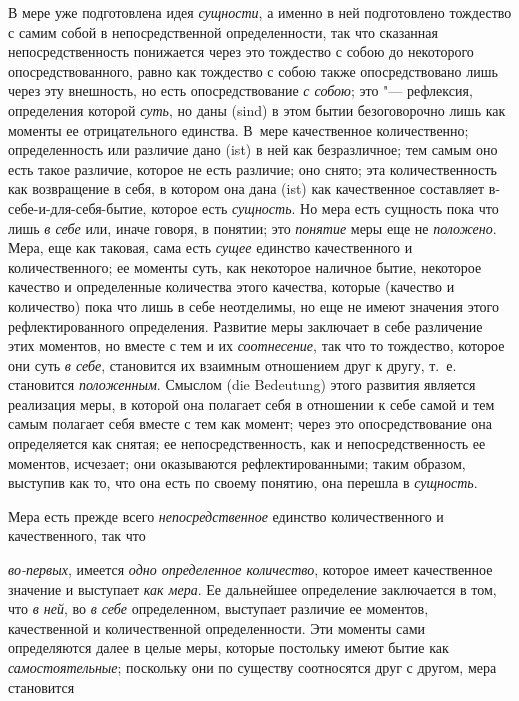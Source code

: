 В мере уже подготовлена идея {\em сущности}, а именно в
ней подготовлено тождество с самим собой в непосредственной определенности,
так что сказанная непосредственность понижается через это тождество с собою
до некоторого опосредствованного, равно как тождество с собою также
опосредствовано лишь через эту внешность, но есть опосредствование
{\em с собою}; это "--- рефлексия, определения которой
{\em суть}, но даны (sind) в этом бытии безоговорочно
лишь как моменты ее отрицательного единства. В~мере качественное
количественно; определенность или различие дано (ist) в ней как
безразличное; тем самым оно есть такое различие, которое не есть различие;
оно снято; эта количественность как возвращение в себя, в котором она дана
(ist) как качественное составляет в-себе-и-для-себя-бытие, которое есть
{\em сущность}. Но мера есть сущность пока что лишь
{\em в себе} или, иначе говоря, в понятии; это
{\em понятие} меры еще не
{\em положено}. Мера, еще как таковая, сама есть
{\em сущее} единство качественного и количественного;
ее моменты суть, как некоторое наличное бытие, некоторое качество и
определенные количества этого качества, которые (качество и количество)
пока что лишь в себе неотделимы, но еще не имеют значения этого
рефлектированного определения. Развитие меры заключает в себе различение
этих моментов, но вместе с тем и их {\em соотнесение},
так что то тождество, которое они суть {\em в себе},
становится их взаимным отношением друг к другу, т.~е. становится
{\em положенным}. Смыслом (die Bedeutung) этого
развития является реализация меры, в которой она полагает себя в отношении
к себе самой и тем самым полагает себя вместе с тем как момент; через это
опосредствование она определяется как снятая; ее непосредственность, как и
непосредственность ее моментов, исчезает; они оказываются
рефлектированными; таким образом, выступив как то, что она есть по своему
понятию, она перешла в {\em сущность}.

Мера есть прежде всего {\em непосредственное} единство
количественного и качественного, так что

{\em во-первых}, имеется {\em одно
определенное количество}, которое имеет качественное значение и выступает
{\em как мера}. Ее дальнейшее определение заключается в
том, что {\em в ней}, во {\em в
себе} определенном, выступает различие ее моментов, качественной и
количественной определенности. Эти моменты сами определяются далее в целые
меры, которые постольку имеют бытие как
{\em самостоятельные}; поскольку они по существу
соотносятся друг с другом, мера становится

